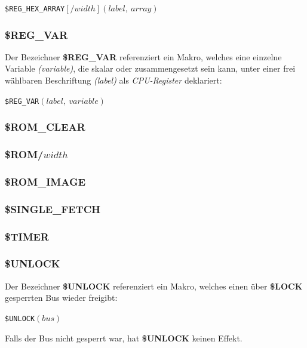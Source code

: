 \documentclass{scrartcl}
\begin{document}
\vspace{10pt}
\texttt{\$REG\_HEX\_ARRAY$[/width](label,~array)$}

\subsubsection{\$REG\_VAR}

\noindent Der Bezeichner \textbf{\$REG\_VAR} referenziert ein Makro, welches eine einzelne Variable \textit{(variable)}, die skalar oder zusammengesetzt sein kann, unter einer frei wählbaren Beschriftung \textit{(label)} als \textit{CPU-Register} deklariert:

\vspace{10pt}
\texttt{\$REG\_VAR$(label,~variable)$}

\subsubsection{\$ROM\_CLEAR}

\subsubsection{\$ROM/$width$}

\subsubsection{\$ROM\_IMAGE}

\subsubsection{\$SINGLE\_FETCH}

\subsubsection{\$TIMER}

\subsubsection{\$UNLOCK}

\noindent Der Bezeichner \textbf{\$UNLOCK} referenziert ein Makro, welches einen über \textbf{\$LOCK} gesperrten Bus wieder freigibt:

\vspace{10pt}
\texttt{\$UNLOCK$(bus)$}

\vspace{10pt}
\noindent Falls der Bus nicht gesperrt war, hat \textbf{\$UNLOCK} keinen Effekt.
\end{document}
